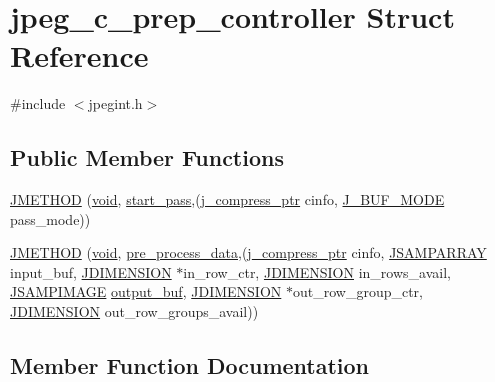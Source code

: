 \hypertarget{structjpeg__c__prep__controller}{}\section{jpeg\+\_\+c\+\_\+prep\+\_\+controller Struct Reference}
\label{structjpeg__c__prep__controller}


{\ttfamily \#include $<$jpegint.\+h$>$}

\subsection*{Public Member Functions}
\begin{DoxyCompactItemize}
\item 
\hyperlink{structjpeg__c__prep__controller_af2fb43bbf035ffe6b1a28fb2382db63d}{J\+M\+E\+T\+H\+O\+D} (\hyperlink{png_8h_aa8c59027f9ab2769342f248709d68d17}{void}, \hyperlink{jddctmgr_8c_a1964f006adb8fb80f57e455f6452aec1}{start\+\_\+pass},(\hyperlink{jpeglib_8h_add2a072c54e3a51550f4975f7ddb91e7}{j\+\_\+compress\+\_\+ptr} cinfo, \hyperlink{jpegint_8h_a1f0803342372ac62b6903c399399c874}{J\+\_\+\+B\+U\+F\+\_\+\+M\+O\+D\+E} pass\+\_\+mode))
\item 
\hyperlink{structjpeg__c__prep__controller_a84100e06666ea90e6734dce2a10af554}{J\+M\+E\+T\+H\+O\+D} (\hyperlink{png_8h_aa8c59027f9ab2769342f248709d68d17}{void}, \hyperlink{jcprepct_8c_a540c9d0777b0f72437600723ff78d9eb}{pre\+\_\+process\+\_\+data},(\hyperlink{jpeglib_8h_add2a072c54e3a51550f4975f7ddb91e7}{j\+\_\+compress\+\_\+ptr} cinfo, \hyperlink{jpeglib_8h_ac9d5d1b829ed51769db69a37271a7e91}{J\+S\+A\+M\+P\+A\+R\+R\+A\+Y} input\+\_\+buf, \hyperlink{jmorecfg_8h_a04ed4674f6f1d0d50ec241531e38274f}{J\+D\+I\+M\+E\+N\+S\+I\+O\+N} $\ast$in\+\_\+row\+\_\+ctr, \hyperlink{jmorecfg_8h_a04ed4674f6f1d0d50ec241531e38274f}{J\+D\+I\+M\+E\+N\+S\+I\+O\+N} in\+\_\+rows\+\_\+avail, \hyperlink{jpeglib_8h_a4bf858e4d42202287e786bdec2f3b62b}{J\+S\+A\+M\+P\+I\+M\+A\+G\+E} \hyperlink{jdct_8h_ad7e4660a191b1a791748dd44d5a7a0ec}{output\+\_\+buf}, \hyperlink{jmorecfg_8h_a04ed4674f6f1d0d50ec241531e38274f}{J\+D\+I\+M\+E\+N\+S\+I\+O\+N} $\ast$out\+\_\+row\+\_\+group\+\_\+ctr, \hyperlink{jmorecfg_8h_a04ed4674f6f1d0d50ec241531e38274f}{J\+D\+I\+M\+E\+N\+S\+I\+O\+N} out\+\_\+row\+\_\+groups\+\_\+avail))
\end{DoxyCompactItemize}


\subsection{Member Function Documentation}
\hypertarget{structjpeg__c__prep__controller_af2fb43bbf035ffe6b1a28fb2382db63d}{}
